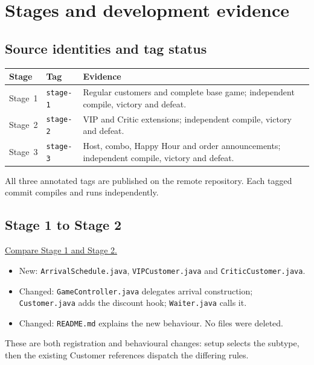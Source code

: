 \section{Stages and development evidence}
\subsection{Source identities and tag status}
\begin{tabularx}{\textwidth}{@{}l l X@{}}
\toprule \textbf{Stage} & \textbf{Tag} & \textbf{Evidence}\\\midrule
Stage~1 & \texttt{stage-1} & Regular customers and complete base game; independent compile, victory and defeat.\\
Stage~2 & \texttt{stage-2} & VIP and Critic extensions; independent compile, victory and defeat.\\
Stage~3 & \texttt{stage-3} & Host, combo, Happy Hour and order announcements; independent compile, victory and defeat.\\
\bottomrule
\end{tabularx}

All three annotated tags are published on the remote repository. Each tagged
commit compiles and runs independently.

\subsection{Stage 1 to Stage 2}
\href{https://github.com/SeraphinaXYX/NTU-SC2002-Restaurant-Rush/compare/stage-1...stage-2}{Compare Stage 1 and Stage 2.}
\begin{itemize}
\item New: \texttt{ArrivalSchedule.java}, \texttt{VIPCustomer.java} and \texttt{CriticCustomer.java}.
\item Changed: \texttt{GameController.java} delegates arrival construction;
\texttt{Customer.java} adds the discount hook; \texttt{Waiter.java} calls it.
\item Changed: \texttt{README.md} explains the new behaviour.
No files were deleted.
\end{itemize}
These are both registration and behavioural changes: setup selects the subtype,
then the existing Customer references dispatch the differing rules.

